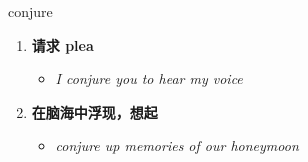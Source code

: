 
\begin{frame}
{\huge conjure}
\begin{center}
\begin{enumerate}\Large
  \item \textbf{请求 plea}
  \begin{itemize}
    \item \em{\Large{I conjure you to hear my voice}}
  \end{itemize}
  \item \textbf{在脑海中浮现，想起}
  \begin{itemize}
    \item \em{\Large{conjure up memories of our honeymoon}}
  \end{itemize}
\end{enumerate}
\end{center}
\end{frame}
